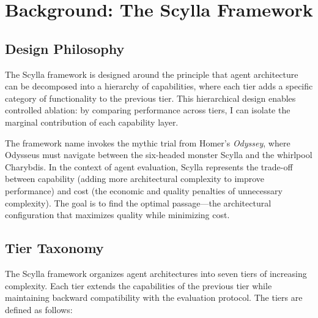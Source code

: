 \documentclass[11pt]{article}
\begin{document}
\section{Background: The Scylla Framework}
\label{sec:background}

\subsection{Design Philosophy}
\label{sec:design_philosophy}

The Scylla framework is designed around the principle that agent architecture
can be decomposed into a hierarchy of capabilities, where each tier adds a
specific category of functionality to the previous tier. This hierarchical
design enables controlled ablation: by comparing performance across tiers,
I can isolate the marginal contribution of each capability layer.

The framework name invokes the mythic trial from Homer's \emph{Odyssey},
where Odysseus must navigate between the six-headed monster Scylla and the
whirlpool Charybdis. In the context of agent evaluation, Scylla represents
the trade-off between capability (adding more architectural complexity to
improve performance) and cost (the economic and quality penalties of
unnecessary complexity). The goal is to find the optimal passage---the
architectural configuration that maximizes quality while minimizing cost.

\subsection{Tier Taxonomy}
\label{sec:tier_taxonomy}

The Scylla framework organizes agent architectures into seven tiers of
increasing complexity. Each tier extends the capabilities of the previous tier
while maintaining backward compatibility with the evaluation protocol. The
tiers are defined as follows:
\end{document}

